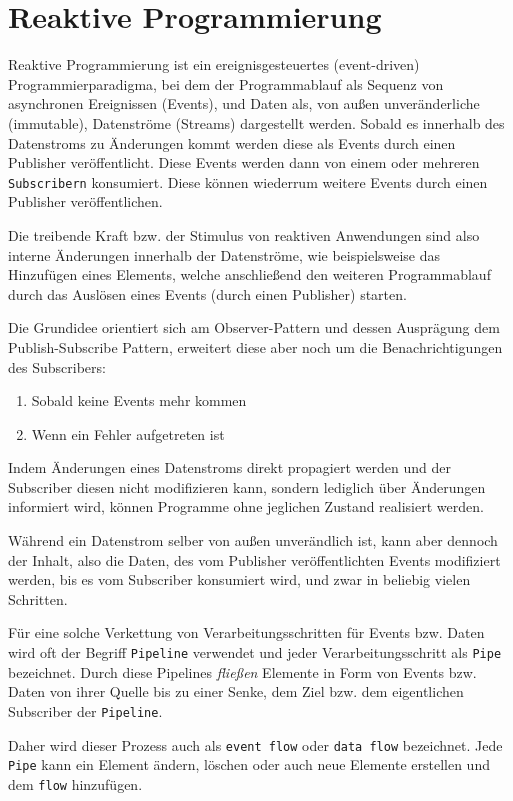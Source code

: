\section{Reaktive Programmierung}
\label{section:reaktive_programmierung}
Reaktive Programmierung ist ein ereignisgesteuertes (event-driven) Programmierparadigma, bei dem der Programmablauf
als Sequenz von asynchronen Ereignissen (Events), und Daten als, von außen unveränderliche (immutable), Datenströme (Streams) dargestellt werden.
Sobald es innerhalb des Datenstroms zu Änderungen kommt werden diese als Events durch einen Publisher veröffentlicht.
Diese Events werden dann von einem oder mehreren \verb|Subscribern| konsumiert. Diese können wiederrum weitere Events durch einen Publisher veröffentlichen.

Die treibende Kraft bzw. der Stimulus von reaktiven Anwendungen sind also interne Änderungen innerhalb der Datenströme, wie beispielsweise das
Hinzufügen eines Elements, welche anschließend den weiteren Programmablauf durch das Auslösen eines Events (durch einen Publisher) starten.

Die Grundidee orientiert sich am Observer-Pattern und dessen Ausprägung dem Publish-Subscribe Pattern, erweitert diese aber
noch um die Benachrichtigungen des Subscribers:
\begin{enumerate}
	\item Sobald keine Events mehr kommen
	\item Wenn ein Fehler aufgetreten ist
\end{enumerate}
Indem Änderungen eines Datenstroms direkt propagiert werden und der Subscriber diesen nicht modifizieren kann, sondern lediglich über Änderungen informiert wird,
können Programme ohne jeglichen Zustand realisiert werden\parencite{Escoffier2017}.

Während ein Datenstrom selber von außen unverändlich ist, kann aber dennoch der Inhalt, also die Daten,
des vom Publisher veröffentlichten Events modifiziert werden, bis es vom
Subscriber konsumiert wird, und zwar in beliebig vielen Schritten.

Für eine solche Verkettung von Verarbeitungsschritten für Events bzw. Daten
wird oft der Begriff \verb|Pipeline| verwendet und jeder Verarbeitungsschritt als \verb|Pipe| bezeichnet.
Durch diese Pipelines \textit{fließen} Elemente in Form von Events bzw. Daten von ihrer Quelle
bis zu einer Senke, dem Ziel bzw. dem eigentlichen Subscriber der \verb|Pipeline|.

Daher wird dieser Prozess auch als \verb|event flow| oder \verb|data flow| bezeichnet.
Jede \verb|Pipe| kann ein Element ändern, löschen oder auch neue Elemente erstellen und dem \verb|flow| hinzufügen.


